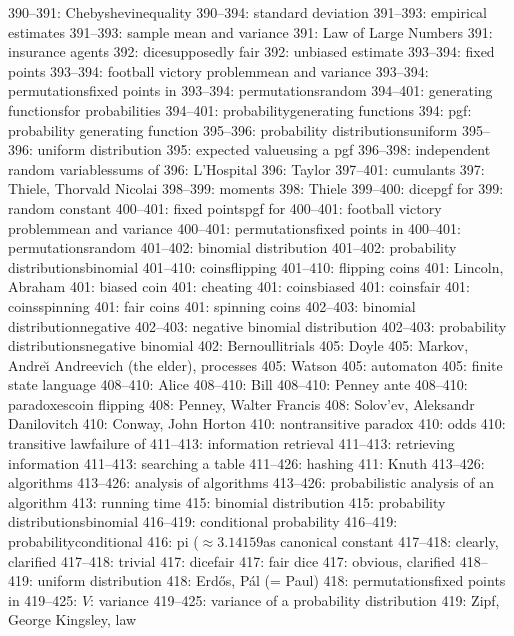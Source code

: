 390--391: Chebyshev\sub inequality
390--394: standard deviation
391--393: empirical estimates
391--393: sample mean and variance
391: Law of Large Numbers
391: insurance agents
392: dice\sub supposedly fair
392: unbiased estimate
393--394: fixed points
393--394: football victory problem\sub mean and variance
393--394: permutations\sub fixed points in
393--394: permutations\sub random
394--401: generating functions\sub for probabilities
394--401: probability\sub generating functions
394: pgf: probability generating function
395--396: probability distributions\sub uniform
395--396: uniform distribution
395: expected value\sub using a pgf
396--398: independent random variables\sub sums of
396: L'Hospital
396: Taylor
397--401: cumulants
397: Thiele, Thorvald Nicolai
398--399: moments
398: Thiele
399--400: dice\sub pgf for
399: random constant
400--401: fixed points\sub pgf for
400--401: football victory problem\sub mean and variance
400--401: permutations\sub fixed points in
400--401: permutations\sub random
401--402: binomial distribution
401--402: probability distributions\sub binomial
401--410: coins\sub flipping
401--410: flipping coins
401: Lincoln, Abraham
401: biased coin
401: cheating
401: coins\sub biased
401: coins\sub fair
401: coins\sub spinning
401: fair coins
401: spinning coins
402--403: binomial distribution\sub negative
402--403: negative binomial distribution
402--403: probability distributions\sub negative binomial
402: Bernoulli\sub trials
405: Doyle
405: Markov, Andre{\u\i} Andreevich (the elder), processes
405: Watson
405: automaton
405: finite state language
408--410: Alice
408--410: Bill
408--410: Penney ante
408--410: paradoxes\sub coin flipping
408: Penney, Walter Francis
408: Solov'ev, Aleksandr Danilovitch
410: Conway, John Horton
410: nontransitive paradox
410: odds
410: transitive law\sub failure of
411--413: information retrieval
411--413: retrieving information
411--413: searching a table
411--426: hashing
411: Knuth
413--426: algorithms
413--426: analysis of algorithms
413--426: probabilistic analysis of an algorithm
413: running time
415: binomial distribution
415: probability distributions\sub binomial
416--419: conditional probability
416--419: probability\sub conditional
416: pi ($\approx3.14159$\sub as canonical constant
417--418: clearly, clarified
417--418: trivial
417: dice\sub fair
417: fair dice
417: obvious, clarified
418--419: uniform distribution
418: Erd\H os, P\'al (= Paul)
418: permutations\sub fixed points in
419--425: $V$: variance
419--425: variance of a probability distribution
419: Zipf, George Kingsley, law
